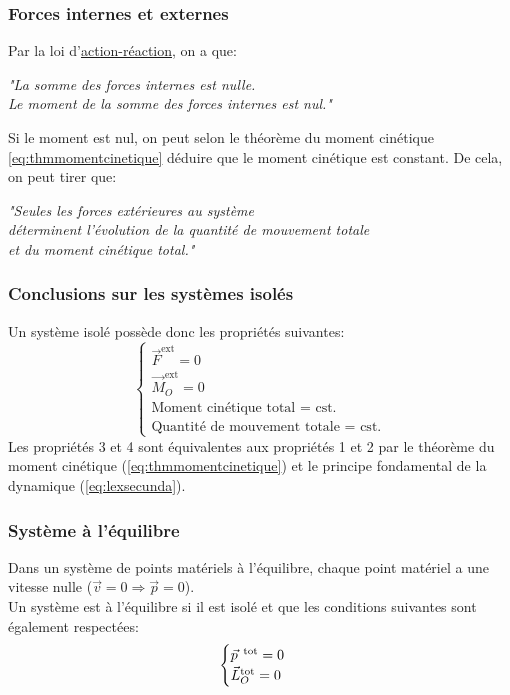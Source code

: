 \documentclass{article}
\numberwithin{equation}{section}
\begin{document}
\subsubsection{Forces internes et externes}
Par la loi d'\hyperref[sec:actionreaction]{action-réaction}, on a que:
\begin{center}
	\emph{"La somme des forces internes est nulle. \\ Le moment de la somme des forces internes est nul."}
\end{center}
Si le moment est nul, on peut selon le théorème du moment cinétique \ref{eq:thmmomentcinetique} déduire que le moment cinétique est constant.
De cela, on peut tirer que:
\begin{center}
	\emph{"Seules les forces extérieures au système \\ déterminent l'évolution de la quantité de mouvement totale \\ et du moment cinétique total."}
\end{center}

\subsubsection{Conclusions sur les systèmes isolés}
Un système isolé possède donc les propriétés suivantes:
\begin{equation}
	\begin{cases}
		\vec F^{\text{ext}} = 0 \\
		\vec M_O^{\text{ext}} = 0 \\
		\text{Moment cinétique total = cst.} \\
		\text{Quantité de mouvement totale = cst.}
	\end{cases}
\end{equation}
Les propriétés 3 et 4 sont équivalentes aux propriétés 1 et 2 par le théorème du moment cinétique (\ref{eq:thmmomentcinetique}) et le principe fondamental de la dynamique (\ref{eq:lexsecunda}).

\subsubsection{Système à l'équilibre}
Dans un système de points matériels à l'équilibre, chaque point matériel a une vitesse nulle (\( \vec v = 0 \Rightarrow \vec p = 0  \)). \\
Un système est à l'équilibre si il est isolé et que les conditions suivantes sont également respectées:
\begin{equation}
	\begin{cases}
		\vec p^{\text{\, tot}} = 0 \\
		\vec L_O^{\text{tot}} = 0
	\end{cases}
\end{equation}
\end{document}
